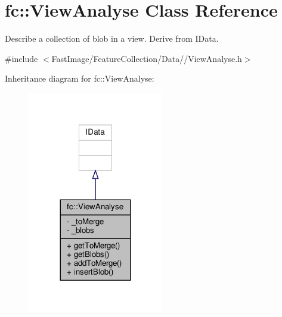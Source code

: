 \hypertarget{classfc_1_1ViewAnalyse}{}\section{fc\+:\+:View\+Analyse Class Reference}
\label{classfc_1_1ViewAnalyse}


Describe a collection of blob in a view. Derive from I\+Data.  




{\ttfamily \#include $<$Fast\+Image/\+Feature\+Collection/\+Data//\+View\+Analyse.\+h$>$}



Inheritance diagram for fc\+:\+:View\+Analyse\+:
\nopagebreak
\begin{figure}[H]
\begin{center}
\leavevmode
\includegraphics[width=168pt]{d9/d8a/classfc_1_1ViewAnalyse__inherit__graph}
\end{center}
\end{figure}


